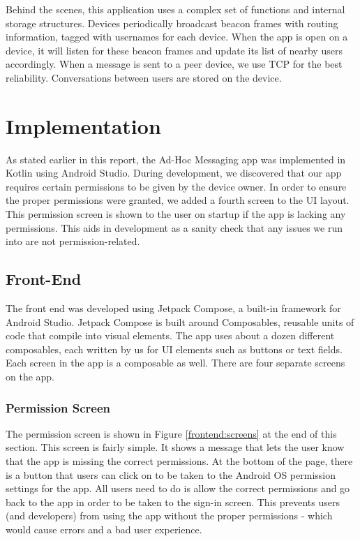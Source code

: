 \documentclass[10pt]{article}
\begin{document}
Behind the scenes, this application uses a complex set of functions and internal storage structures. Devices  periodically broadcast beacon frames with routing information, tagged with usernames for each device. When the app is open on a device, it will listen for these beacon frames and update its list of nearby users accordingly. When a message is sent to a peer device, we use TCP for the best reliability. Conversations between users are stored on the device.

\section{Implementation}

As stated earlier in this report, the Ad-Hoc Messaging app was implemented in Kotlin using Android Studio. During development, we discovered that our app requires certain permissions to be given by the device owner. In order to ensure the proper permissions were granted, we added a fourth screen to the UI layout. This permission screen is shown to the user on startup if the app is lacking any permissions. This aids in development as a sanity check that any issues we run into are not permission-related.

\subsection{Front-End}
The front end was developed using Jetpack Compose, a built-in framework for Android Studio. Jetpack Compose is built around Composables, reusable units of code that compile into visual elements. The app uses about a dozen different composables, each written by us for UI elements such as buttons or text fields. Each screen in the app is a composable as well.
There are four separate screens on the app. 

\subsubsection{Permission Screen}

The permission screen is shown in Figure \ref{frontend:screens} at the end of this section. This screen is fairly simple. It shows a message that lets the user know that the app is missing the correct permissions. At the bottom of the page, there is a button that users can click on to be taken to the Android OS permission settings for the app. All users need to do is allow the correct permissions and go back to the app in order to be taken to the sign-in screen. This prevents users (and developers) from using the app without the proper permissions - which would cause errors and a bad user experience.
\end{document}
